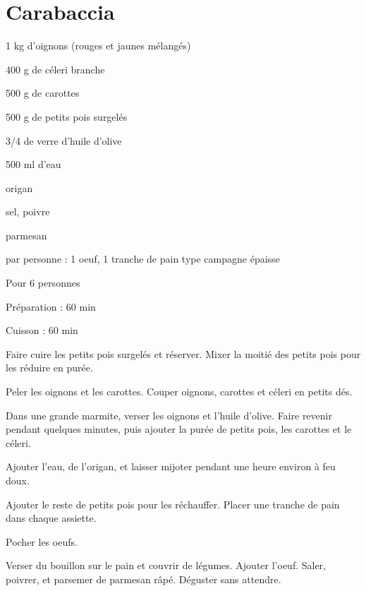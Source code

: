 \section{Carabaccia}

\begin{ingredients}
\item 1 kg d'oignons (rouges et jaunes mélangés)
\item 400 g de céleri branche
\item 500 g de carottes
\item 500 g de petits pois surgelés
\item 3/4 de verre d'huile d'olive
\item 500 ml d'eau
\item origan
\item sel, poivre
\item parmesan
\item par personne : 1 oeuf, 1 tranche de pain type campagne épaisse
\end{ingredients}
\begin{infos}
\item Pour 6 personnes		%
\item Préparation : 60 min		%
\item Cuisson : 60 min			%
\end{infos}
\begin{etapes}
\item Faire cuire les petits pois surgelés et réserver. Mixer la moitié des petits pois pour les réduire en purée.
\item Peler les oignons et les carottes. Couper oignons, carottes et céleri en petits dés.
\item Dans une grande marmite, verser les oignons et l’huile d’olive. Faire revenir pendant quelques minutes, puis ajouter  la purée de petits pois, les carottes et le céleri.
\item Ajouter l’eau, de l’origan, et laisser mijoter pendant une heure environ à feu doux.
\item Ajouter le reste de petits pois pour les réchauffer. Placer une tranche de pain dans chaque assiette.
\item Pocher les oeufs.
\item Verser du bouillon sur le pain et couvrir de légumes. Ajouter l'oeuf. Saler, poivrer, et parsemer de parmesan râpé. Déguster sans attendre.
\end{etapes}
\begin{conseils}
\end{conseils}
